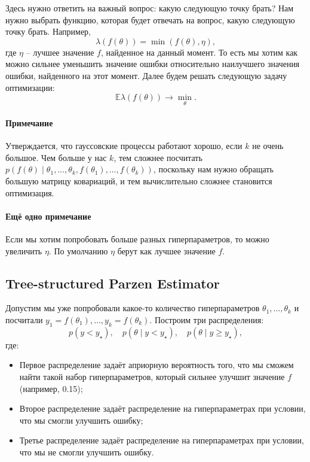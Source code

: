 \documentclass[12pt, fleqn]{article}
\begin{document}
Здесь нужно ответить на важный вопрос: какую следующую точку брать?
Нам нужно выбрать функцию, которая будет отвечать на вопрос, какую следующую точку брать.
Например,
\[
	\lambda(f(\theta)) = \min (f(\theta), \eta),
\]
где $\eta$ -- лучшее значение $f$, найденное на данный момент.
То есть мы хотим как можно сильнее уменьшить значение ошибки относительно наилучшего значения ошибки, найденного на этот момент.
Далее будем решать следующую задачу оптимизации:
\[
	\mathbb{E} \lambda (f(\theta)) \to \min\limits_{\theta}.
\]

\paragraph{Примечание} Утверждается, что гауссовские процессы работают хорошо, если $k$ не очень большое.
Чем больше у нас $k$, тем сложнее посчитать $p(f(\theta) \mid \theta_{1}, \ldots, \theta_{k}, f(\theta_{1}), \ldots, f(\theta_{k}))$, поскольку нам нужно обращать большую матрицу ковариаций, и тем вычислительно сложнее становится оптимизация.


\paragraph{Ещё одно примечание} Если мы хотим попробовать больше разных гиперпараметров, то можно увеличить $\eta$.
По умолчанию $\eta$ берут как лучшее значение $f$.

\subsection{Tree-structured Parzen Estimator}

Допустим мы уже попробовали какое-то количество гиперпараметров $\theta_{1}, \ldots, \theta_{k}$ и посчитали $y_{1} = f(\theta_{1}), \ldots, y_{k} = f(\theta_{k})$.
Построим три распределения:
\[
	p(y < y_{\star}), \quad p(\theta \mid y < y_{\star}), \quad p(\theta \mid y \geqslant y_{\star}),
\]
где:
\begin{itemize}
	\item Первое распределение задаёт априорную вероятность того, что мы сможем найти такой набор гиперпараметров, который сильнее улучшит значение $f$ (например, 0.15);
	\item Второе распределение задаёт распределение на гиперпараметрах при условии, что мы смогли улучшить ошибку;
	\item Третье распределение задаёт распределение на гиперпараметрах при условии, что мы не смогли улучшить ошибку.
\end{itemize}
\end{document}
